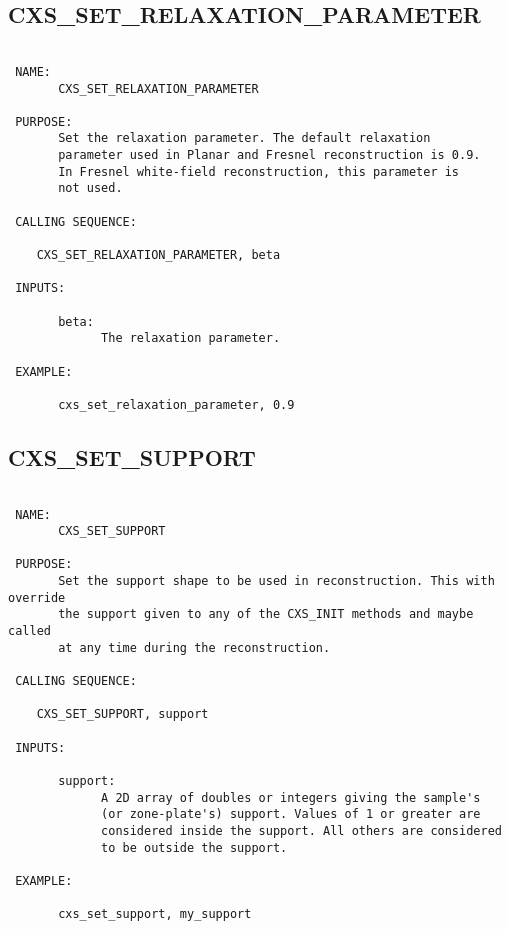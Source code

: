   
 
\subsection{CXS\_SET\_RELAXATION\_PARAMETER}
\begin{verbatim}

 NAME:
       CXS_SET_RELAXATION_PARAMETER

 PURPOSE:
       Set the relaxation parameter. The default relaxation
       parameter used in Planar and Fresnel reconstruction is 0.9.
       In Fresnel white-field reconstruction, this parameter is 
       not used.

 CALLING SEQUENCE:

	CXS_SET_RELAXATION_PARAMETER, beta

 INPUTS:

       beta: 
             The relaxation parameter.

 EXAMPLE:

       cxs_set_relaxation_parameter, 0.9

\end{verbatim}






  
 
\subsection{CXS\_SET\_SUPPORT}
\begin{verbatim}

 NAME:
       CXS_SET_SUPPORT

 PURPOSE:
       Set the support shape to be used in reconstruction. This with override 
       the support given to any of the CXS_INIT methods and maybe called
       at any time during the reconstruction.  

 CALLING SEQUENCE:

	CXS_SET_SUPPORT, support

 INPUTS:

       support: 
             A 2D array of doubles or integers giving the sample's 
             (or zone-plate's) support. Values of 1 or greater are 
             considered inside the support. All others are considered 
             to be outside the support.

 EXAMPLE:

       cxs_set_support, my_support


\end{verbatim}






